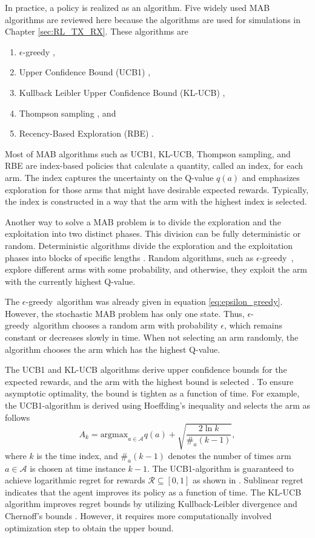 \documentclass[english, 12pt, a4paper, elec, utf8, a-1b, online]{aaltothesis}
\numberwithin{equation}{section}
\newcommand{\As}{\mathcal{A}}
\newcommand{\Rs}{\mathcal{R}}
\newcommand{\argmax}{\text{argmax}}
\newcommand{\egreedy}{$\epsilon$-greedy~}
\begin{document}
In practice, a policy is realized as an algorithm.
Five widely used MAB algorithms are reviewed here because the algorithms are used for simulations in Chapter \ref{sec:RL_TX_RX}.
These algorithms are
\begin{enumerate}
    \item $\epsilon$-greedy \cite{Sutton2018},
    \item Upper Confidence Bound (UCB1) \cite{Auer2002, Garivier2008},
    \item Kullback Leibler Upper Confidence Bound (KL-UCB) \cite{Garivier2011},
    \item Thompson sampling \cite{Agrawal2012, Raj2017}, and
    \item Recency-Based Exploration (RBE) \cite{Oksanen2015,Oksanen2017}.
\end{enumerate}
Most of MAB algorithms such as UCB1, KL-UCB, Thompson sampling, and RBE are index-based policies that calculate a quantity, called an index, for each arm. 
The index captures the uncertainty on the Q-value $q(a)$ and emphasizes exploration for those arms that might have desirable expected rewards. 
Typically, the index is constructed in a way that the arm with the highest index is selected.

Another way to solve a MAB problem is to divide the exploration and the exploitation into two distinct phases. 
This division can be fully deterministic or random. 
Deterministic algorithms divide the exploration and the exploitation phases into blocks of specific lengths \cite{Lattimore2019}. 
Random algorithms, such as \egreedy, explore different arms with some probability, and otherwise, they exploit the arm with the currently highest Q-value.

The \egreedy algorithm was already given in equation \eqref{eq:epsilon_greedy}.
However, the stochastic MAB problem has only one state.
Thus, \egreedy algorithm chooses a random arm with probability $\epsilon$, which remains constant or decreases slowly in time. 
When not selecting an arm randomly, the algorithm chooses the arm which has the highest Q-value.

The UCB1 and KL-UCB algorithms derive upper confidence bounds for the expected rewards, and the arm with the highest bound is selected \cite{Auer2002, Garivier2011}.
To ensure asymptotic optimality, the bound is tighten as a function of time.
For example, the UCB1-algorithm is derived using Hoeffding's inequality and selects the arm as follows \cite{Auer2002}
\begin{equation}
    A_k = \argmax_{a \in \As} q(a) + \sqrt{\frac{2 \ln{k}}{\#_a(k-1)}},
\end{equation}
where $k$ is the time index, and $\#_a(k-1)$ denotes the number of times arm $a \in \As$ is chosen at time instance $k-1$.
The UCB1-algorithm is guaranteed to achieve logarithmic regret for rewards $\Rs \subseteq [0, 1]$ as shown in \cite{Auer2002}.
Sublinear regret indicates that the agent improves its policy as a function of time.
The KL-UCB algorithm improves regret bounds by utilizing Kullback-Leibler divergence and Chernoff's bounds \cite{Garivier2011}.
However, it requires more computationally involved optimization step to obtain the upper bound.
\end{document}
